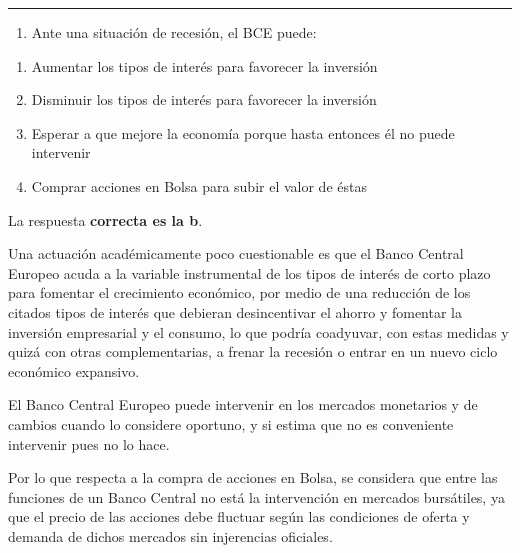 \documentclass[
  letterpaper,
  DIV=11,
  numbers=noendperiod]{scrreprt}
\providecommand{\tightlist}{%
  \setlength{\itemsep}{0pt}\setlength{\parskip}{0pt}}\usepackage{longtable,booktabs,array}
\begin{document}
\begin{center}\rule{0.5\linewidth}{0.5pt}\end{center}

\begin{enumerate}
\def\labelenumi{\arabic{enumi}.}
\setcounter{enumi}{17}
\tightlist
\item
  Ante una situación de recesión, el BCE puede:
\end{enumerate}

\begin{enumerate}
\def\labelenumi{\alph{enumi})}
\item
  Aumentar los tipos de interés para favorecer la inversión
\item
  Disminuir los tipos de interés para favorecer la inversión
\item
  Esperar a que mejore la economía porque hasta entonces él no puede
  intervenir
\item
  Comprar acciones en Bolsa para subir el valor de éstas
\end{enumerate}

\begin{tcolorbox}[enhanced jigsaw, left=2mm, opacityback=0, colback=white, breakable, arc=.35mm, bottomrule=.15mm, rightrule=.15mm, toprule=.15mm, leftrule=.75mm, colframe=quarto-callout-tip-color-frame]
\begin{minipage}[t]{5.5mm}
\textcolor{quarto-callout-tip-color}{\faLightbulb}
\end{minipage}%
\begin{minipage}[t]{\textwidth - 5.5mm}

La respuesta \textbf{correcta es la b}.

Una actuación académicamente poco cuestionable es que el Banco Central
Europeo acuda a la variable instrumental de los tipos de interés de
corto plazo para fomentar el crecimiento económico, por medio de una
reducción de los citados tipos de interés que debieran desincentivar el
ahorro y fomentar la inversión empresarial y el consumo, lo que podría
coadyuvar, con estas medidas y quizá con otras complementarias, a frenar
la recesión o entrar en un nuevo ciclo económico expansivo.

El Banco Central Europeo puede intervenir en los mercados monetarios y
de cambios cuando lo considere oportuno, y si estima que no es
conveniente intervenir pues no lo hace.

Por lo que respecta a la compra de acciones en Bolsa, se considera que
entre las funciones de un Banco Central no está la intervención en
mercados bursátiles, ya que el precio de las acciones debe fluctuar
según las condiciones de oferta y demanda de dichos mercados sin
injerencias oficiales.

\end{minipage}%
\end{tcolorbox}
\end{document}
